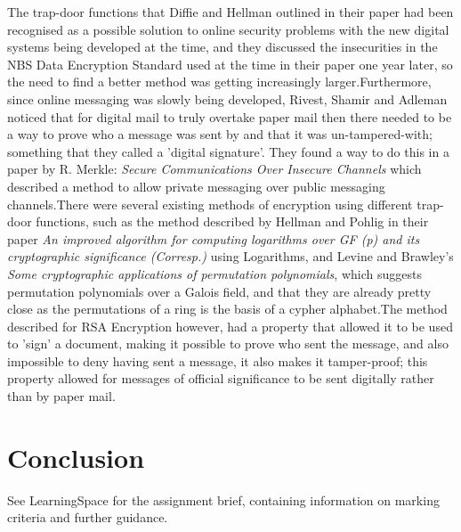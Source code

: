 \documentclass{article}
\begin{document}
The trap-door functions that Diffie and Hellman outlined in their paper\cite{diffie1976new} had been recognised as a possible solution to online security problems with the new digital systems being developed at the time, and they discussed the insecurities in the NBS Data Encryption Standard used at the time in their paper one year later\cite{diffie1977special}, so the need to find a better method was getting increasingly larger.\newline Furthermore, since online messaging was slowly being developed, Rivest, Shamir and Adleman noticed that for digital mail to truly overtake paper mail then there needed to be a way to prove who a message was sent by and that it was un-tampered-with; something that they called a 'digital signature'. They found a way to do this in a paper by R. Merkle: \textit{Secure Communications Over Insecure Channels} which described a method to allow private messaging over public messaging channels\cite{merkle1978secure}.\newline There were several existing methods of encryption using different trap-door functions, such as the method described by Hellman and Pohlig in their paper \textit{An improved algorithm for computing logarithms over GF (p) and its cryptographic significance (Corresp.)}\cite{pohlig1978improved} using Logarithms, and Levine and Brawley's \textit{Some cryptographic applications of permutation polynomials}\cite{levine1977some}, which suggests permutation polynomials over a Galois field, and that they are already pretty close as the permutations of a ring is the basis of a cypher alphabet.\newline The method described for RSA Encryption however, had a property that allowed it to be used to 'sign' a document, making it possible to prove who sent the message, and also impossible to deny having sent a message, it also makes it tamper-proof; this property allowed for messages of official significance to be sent digitally rather than by paper mail.

\section{Conclusion}

See LearningSpace for the assignment brief, containing information on marking criteria and further guidance.



\end{document}
